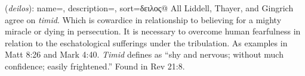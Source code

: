 \item[Timid,]

(\textit{deilos}):
{
    name=,
    description={},
    sort=δειλος@
}
All Liddell, Thayer, and Gingrich agree on \emph{timid}. Which is cowardice in relationship to believing for a mighty miracle or dying in persecution. It is necessary to overcome human fearfulness in relation to the eschatological sufferings under the tribulation. As examples in Matt 8:26 and Mark 4:40. \emph{Timid} defines as ``shy and nervous; without much confidence; easily frightened.''
Found in Rev 21:8.
